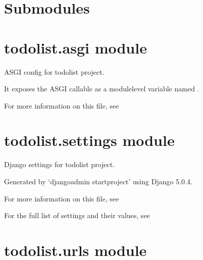 \documentclass[letterpaper,10pt,english]{sphinxmanual}
\begin{document}
\section{Submodules}
\label{\detokenize{todolist:submodules}}

\section{todolist.asgi module}
\label{\detokenize{todolist:module-todolist.asgi}}\label{\detokenize{todolist:todolist-asgi-module}}
\sphinxAtStartPar
ASGI config for todolist project.

\sphinxAtStartPar
It exposes the ASGI callable as a module\sphinxhyphen{}level variable named .

\sphinxAtStartPar
For more information on this file, see


\section{todolist.settings module}
\label{\detokenize{todolist:module-todolist.settings}}\label{\detokenize{todolist:todolist-settings-module}}
\sphinxAtStartPar
Django settings for todolist project.

\sphinxAtStartPar
Generated by ‘django\sphinxhyphen{}admin startproject’ using Django 5.0.4.

\sphinxAtStartPar
For more information on this file, see

\sphinxAtStartPar
For the full list of settings and their values, see


\section{todolist.urls module}
\label{\detokenize{todolist:module-todolist.urls}}\label{\detokenize{todolist:todolist-urls-module}}
\end{document}
